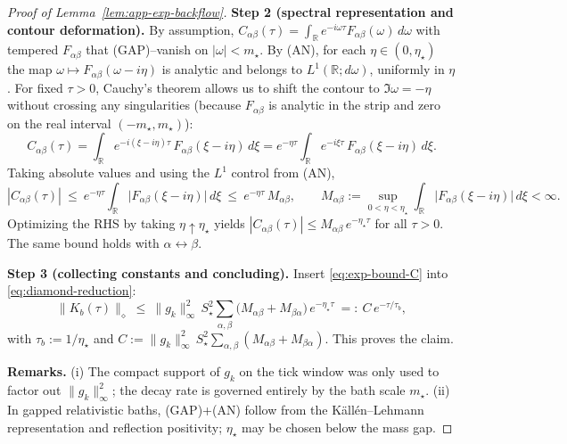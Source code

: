 \documentclass[10pt]{article}
\theoremstyle{definition}
\theoremstyle{plain}
\begin{document}
\begin{proof}[Proof of Lemma~\ref{lem:app-exp-backflow}]
\smallskip
\textbf{Step 2 (spectral representation and contour deformation).}
By assumption,
\(
C_{\alpha\beta}(\tau)=\int_{\mathbb R}e^{-i\omega\tau}F_{\alpha\beta}(\omega)\,d\omega
\)
with tempered \(F_{\alpha\beta}\) that (GAP)–vanish on \(|\omega|<m_\star\).
By (AN), for each \(\eta\in(0,\eta_\star)\) the map \(\omega\mapsto F_{\alpha\beta}(\omega-i\eta)\) is analytic and belongs to \(L^1(\mathbb R;d\omega)\), uniformly in \(\eta\).
For fixed \(\tau>0\), Cauchy’s theorem allows us to shift the contour to \(\Im\omega=-\eta\) without crossing any singularities
(because \(F_{\alpha\beta}\) is analytic in the strip and zero on the real interval \((-m_\star,m_\star)\)):
\begin{equation}\label{eq:contour-shift}
C_{\alpha\beta}(\tau)
=\int_{\mathbb R} e^{-i(\xi-i\eta)\tau}\,F_{\alpha\beta}(\xi-i\eta)\,d\xi
= e^{-\eta\tau}\int_{\mathbb R} e^{-i\xi\tau}\,F_{\alpha\beta}(\xi-i\eta)\,d\xi.
\end{equation}
Taking absolute values and using the \(L^1\) control from (AN),
\begin{equation}\label{eq:exp-bound-C}
|C_{\alpha\beta}(\tau)| \ \le\ e^{-\eta\tau}\int_{\mathbb R}\big|F_{\alpha\beta}(\xi-i\eta)\big|\,d\xi
\ \le\ e^{-\eta\tau}\,M_{\alpha\beta},
\qquad
M_{\alpha\beta}:=\sup_{0<\eta<\eta_\star}\int_{\mathbb R}\big|F_{\alpha\beta}(\xi-i\eta)\big|\,d\xi<\infty.
\end{equation}
Optimizing the RHS by taking \(\eta\uparrow\eta_\star\) yields
\(
|C_{\alpha\beta}(\tau)| \le M_{\alpha\beta}\,e^{-\eta_\star\tau}
\)
for all \(\tau>0\). The same bound holds with \(\alpha\leftrightarrow\beta\).

\smallskip
\textbf{Step 3 (collecting constants and concluding).}
Insert \eqref{eq:exp-bound-C} into \eqref{eq:diamond-reduction}:
\[
\big\|K_b(\tau)\big\|_\diamond
\ \le\ \|g_k\|_\infty^2\,S_\star^2\sum_{\alpha,\beta}\big(M_{\alpha\beta}+M_{\beta\alpha}\big)\,e^{-\eta_\star\tau}
\ =:\ C\,e^{-\tau/\tau_b},
\]
with \(\tau_b:=1/\eta_\star\) and
\(
C:=\|g_k\|_\infty^2\,S_\star^2\sum_{\alpha,\beta}(M_{\alpha\beta}+M_{\beta\alpha}).
\)
This proves the claim.

\smallskip
\textbf{Remarks.}
(i) The compact support of \(g_k\) on the tick window was only used to factor out \(\|g_k\|_\infty^2\); the decay rate is governed entirely by the bath scale \(m_\star\).
(ii) In gapped relativistic baths, (GAP)+(AN) follow from the Källén–Lehmann representation and reflection positivity; \(\eta_\star\) may be chosen below the mass gap.
\end{proof}
\end{document}
